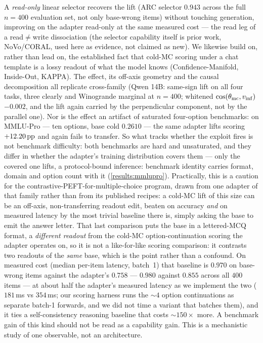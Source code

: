 A \emph{read-only} linear selector recovers the lift (ARC selector $0.943$ across
the full $n{=}400$ evaluation set, not only base-wrong items) without touching
generation, improving on the adapter read-only at the same measured cost --- the read
leg of a read${\neq}$write
dissociation (the selector capability itself is prior work, NoVo/CORAL, used here as
evidence, not claimed as new). We likewise build on, rather than lead on, the
established fact that cold-MC scoring under a chat template is a lossy readout of
what the model knows (Confidence-Manifold, Inside-Out, KAPPA). The effect, its off-axis
geometry and the causal decomposition all replicate cross-family (Qwen 14B:
same-sign lift on all four tasks, three clearly and Winogrande marginal at
$n{=}400$; whitened $\cos(\theta_{\mathrm{mc}}, v_{\mathrm{inf}})$ $-0.002$, and the lift again carried by
the perpendicular component, not by the parallel one). Nor is the effect an artifact
of saturated four-option benchmarks: on MMLU-Pro --- ten options, base cold
$0.2610$ --- the same adapter lifts scoring $+12.20\,\mathrm{pp}$ and again fails to
transfer. So what tracks whether the exploit fires is not benchmark difficulty: both
benchmarks are hard and unsaturated, and they differ in whether the adapter's training
distribution covers them --- only the covered one lifts, a protocol-bound inference:
benchmark identity carries format, domain and option count with it
(\cref{results:mmlupro}). Practically, this
is a caution for the contrastive-PEFT-for-multiple-choice program, drawn from one
adapter of that family rather than from its published recipes: a cold-MC lift of
this size can be an off-axis, non-transferring readout edit, beaten on accuracy
\emph{and} on measured latency by the most trivial baseline
there is, simply asking the base to emit the answer letter. That last comparison puts
the base in a lettered-MCQ format, a \emph{different readout} from the cold-MC
option-continuation scoring the adapter operates on, so it is not a like-for-like
scoring comparison: it contrasts two readouts of the \emph{same} base, which is the
point rather than a confound. On measured cost (median
per-item latency, batch~1) that baseline is $0.970$ on base-wrong items against the
adapter's $0.758$ --- $0.980$ against $0.855$ across all $400$ items --- at about
half the adapter's measured latency as we implement the two ($181$\,ms vs
$354$\,ms; our scoring harness runs the ${\sim}4$ option continuations as separate
batch-1 forwards, and we did not time a variant that batches them), and it ties a
self-consistency reasoning baseline that costs ${\sim}150\times$ more. A benchmark gain of this kind
should not be read as a capability gain. This is a mechanistic study of one
observable, not an architecture.
